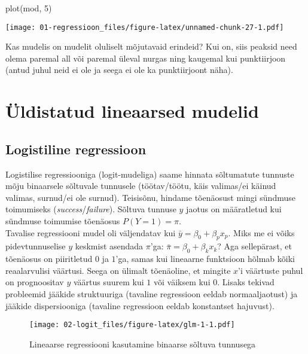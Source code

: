 \documentclass[
]{book}
\newenvironment{Shaded}{\begin{snugshade}}{\end{snugshade}}
\newcommand{\DecValTok}[1]{\textcolor[rgb]{0.00,0.00,0.81}{#1}}
\newcommand{\FunctionTok}[1]{\textcolor[rgb]{0.00,0.00,0.00}{#1}}
\newcommand{\NormalTok}[1]{#1}
\begin{document}
\begin{Shaded}
\begin{Highlighting}[]
\FunctionTok{plot}\NormalTok{(mod, }\DecValTok{5}\NormalTok{)}
\end{Highlighting}
\end{Shaded}

\texttt{[image: 01-regressioon\_files/figure-latex/unnamed-chunk-27-1.pdf]}

Kas mudelis on mudelit oluliselt mõjutavaid erindeid? Kui on, siis peaksid need olema paremal all või paremal üleval nurgas ning kaugemal kui punktiirjoon (antud juhul neid ei ole ja seega ei ole ka punktiirjoont näha).

\hypertarget{part-uxfcldistatud-lineaarsed-mudelid}{%
\part{Üldistatud lineaarsed mudelid}\label{part-uxfcldistatud-lineaarsed-mudelid}}

\hypertarget{logistiline-regressioon}{%
\chapter{Logistiline regressioon}\label{logistiline-regressioon}}

Logistilise regressiooniga (logit-mudeliga) saame hinnata sõltumatute tunnuste mõju binaarsele sõltuvale tunnusele (töötav/töötu, käis valimas/ei käinud valimas, surnud/ei ole surnud). Teisisõnu, hindame tõenäosust mingi sündmuse toimumiseks (\emph{success}/\emph{failure}). Sõltuva tunnuse \(y\) jaotus on määratletud kui sündmuse toimumise tõenäosus \(P(Y=1)=\pi\).\\
Tavalise regressiooni mudel oli väljendatav kui \(\bar{y}=\beta_0+\beta_p x_p\). Miks me ei võiks pidevtunnuselise \(y\) keskmist asendada \(\pi\)'ga: \(\bar{\pi}=\beta_0+\beta_k x_k\)? Aga sellepärast, et tõenäosus on piiritletud \(0\) ja \(1\)'ga, samas kui lineaarne funktsioon hõlmab kõiki reaalarvulisi väärtusi. Seega on ülimalt tõenäoline, et mingite \(x\)'i väärtuste puhul on prognoositav \(y\) väärtus suurem kui \(1\) või väiksem kui \(0\). Lisaks tekivad probleemid jääkide struktuuriga (tavaline regressioon eeldab normaaljaotust) ja jääkide dispersiooniga (tavaline regressioon eeldab konstantset hajuvust).

\begin{figure}
\centering
\texttt{[image: 02-logit\_files/figure-latex/glm-1-1.pdf]}
\caption{\label{fig:glm-1}Lineaarse regressiooni kasutamine binaarse sõltuva tunnusega}
\end{figure}
\end{document}
